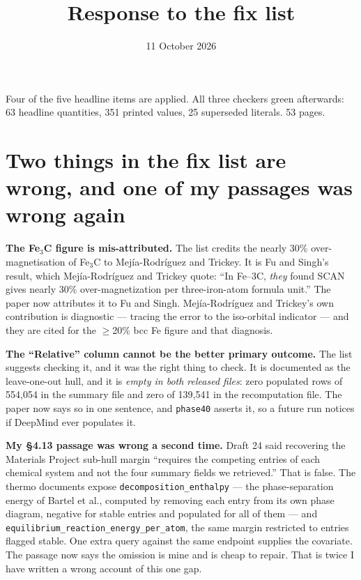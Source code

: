 \documentclass[11pt]{article}
\title{\textbf{Response to the fix list}}
\author{}\date{11 October 2026}
\begin{document}
\maketitle\vspace{-3em}

Four of the five headline items are applied. All three checkers green afterwards: 63
headline quantities, 351 printed values, 25 superseded literals. 53 pages.

\section*{Two things in the fix list are wrong, and one of my passages was wrong again}

\textbf{The Fe$_3$C figure is mis-attributed.} The list credits the nearly 30\%
over-magnetisation of Fe$_3$C to Mej\'ia-Rodr\'iguez and Trickey. It is Fu and Singh's
result, which Mej\'ia-Rodr\'iguez and Trickey quote: ``In Fe--3C, \emph{they} found SCAN
gives nearly 30\% over-magnetization per three-iron-atom formula unit.'' The paper now
attributes it to Fu and Singh. Mej\'ia-Rodr\'iguez and Trickey's own contribution is
diagnostic --- tracing the error to the iso-orbital indicator --- and they are cited for
the $\ge$20\% bcc Fe figure and that diagnosis.

\textbf{The ``Relative'' column cannot be the better primary outcome.} The list suggests
checking it, and it was the right thing to check. It is documented as the leave-one-out
hull, and it is \emph{empty in both released files}: zero populated rows of 554{,}054 in
the summary file and zero of 139{,}541 in the recomputation file. The paper now says so in
one sentence, and \texttt{phase40} asserts it, so a future run notices if DeepMind ever
populates it.

\textbf{My \S4.13 passage was wrong a second time.} Draft 24 said recovering the
Materials Project sub-hull margin ``requires the competing entries of each chemical system
and not the four summary fields we retrieved.'' That is false. The thermo documents expose
\texttt{decomposition\_enthalpy} --- the phase-separation energy of Bartel et al., computed
by removing each entry from its own phase diagram, negative for stable entries and
populated for all of them --- and
\texttt{equilibrium\_rea}\-\texttt{ction\_energy\_per\_atom}, the same margin restricted to
entries flagged stable. One extra query against the same
endpoint supplies the covariate. The passage now says the omission is mine and is cheap to
repair. That is twice I have written a wrong account of this one gap.
\end{document}
